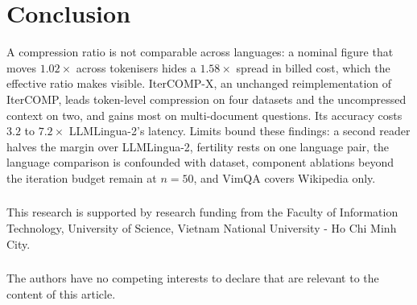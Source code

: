 \documentclass[runningheads]{llncs}
\begin{document}
\section{Conclusion}
A compression ratio is not comparable across languages: a nominal figure that
moves $1.02\times$ across tokenisers hides a $1.58\times$ spread in billed cost,
which the effective ratio makes visible. IterCOMP-X, an unchanged
reimplementation of IterCOMP, leads token-level compression on four datasets and
the uncompressed context on two, and gains most on multi-document questions. Its accuracy costs $3.2$ to $7.2\times$
LLMLingua-2's latency. Limits bound these findings: a second reader halves the
margin over LLMLingua-2, fertility rests on one language pair, the
language comparison is confounded with dataset, component ablations beyond the
iteration budget remain at $n=50$, and VimQA covers Wikipedia only.

\begin{credits}
\subsubsection{\ackname} This research is supported by research funding from
the Faculty of Information Technology, University of Science, Vietnam National
University - Ho Chi Minh City.

\subsubsection{\discintname} The authors have no competing interests to declare
that are relevant to the content of this article.
\end{credits}



\end{document}
